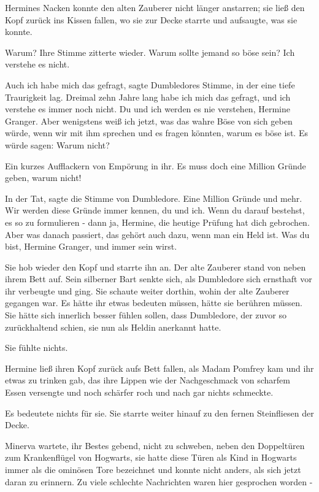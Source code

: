 Hermines Nacken konnte den alten Zauberer nicht länger anstarren; sie ließ den
Kopf zurück ins Kissen fallen, wo sie zur Decke starrte und aufsaugte, was sie
konnte.

\glqq{}Warum?\grqq{} Ihre Stimme zitterte wieder. \glqq{}Warum sollte jemand so
böse sein? Ich verstehe es nicht.\grqq{}

\glqq{}Auch ich habe mich das gefragt\grqq{}, sagte Dumbledores Stimme, in der
eine tiefe Traurigkeit lag. \glqq{}Dreimal zehn Jahre lang habe ich mich das
gefragt, und ich verstehe es immer noch nicht. Du und ich werden es nie
verstehen, Hermine Granger. Aber wenigstens weiß ich jetzt, was das wahre Böse
von sich geben würde, wenn wir mit ihm sprechen und es fragen könnten, warum es
böse ist. Es würde sagen: \glqq{}Warum nicht?\grqq{}

Ein kurzes Aufflackern von Empörung in ihr. \glqq{}Es muss doch eine Million
Gründe geben, warum nicht!\grqq{}

\glqq{}In der Tat\grqq{}, sagte die Stimme von Dumbledore. \glqq{}Eine Million
Gründe und mehr. Wir werden diese Gründe immer kennen, du und ich. Wenn du
darauf bestehst, es so zu formulieren - dann ja, Hermine, die heutige Prüfung
hat dich gebrochen. Aber was danach passiert, das gehört auch dazu, wenn man ein
Held ist. Was du bist, Hermine Granger, und immer sein wirst.\grqq{}

Sie hob wieder den Kopf und starrte ihn an. Der alte Zauberer stand von neben
ihrem Bett auf. Sein silberner Bart senkte sich, als Dumbledore sich ernsthaft
vor ihr verbeugte und ging. Sie schaute weiter dorthin, wohin der alte Zauberer
gegangen war. Es hätte ihr etwas bedeuten müssen, hätte sie berühren müssen. Sie
hätte sich innerlich besser fühlen sollen, dass Dumbledore, der zuvor so
zurückhaltend schien, sie nun als Heldin anerkannt hatte.

Sie fühlte nichts.

Hermine ließ ihren Kopf zurück aufs Bett fallen, als Madam Pomfrey kam und ihr
etwas zu trinken gab, das ihre Lippen wie der Nachgeschmack von scharfem Essen
versengte und noch schärfer roch und nach gar nichts schmeckte.

Es bedeutete nichts für sie. Sie starrte weiter hinauf zu den fernen
Steinfliesen der Decke.

Minerva wartete, ihr Bestes gebend, nicht zu schweben, neben den Doppeltüren zum
Krankenflügel von Hogwarts, sie hatte diese Türen als Kind in Hogwarts immer als
\glqq{}die ominösen Tore\grqq{} bezeichnet und konnte nicht anders, als sich
jetzt daran zu erinnern. Zu viele schlechte Nachrichten waren hier gesprochen
worden -

